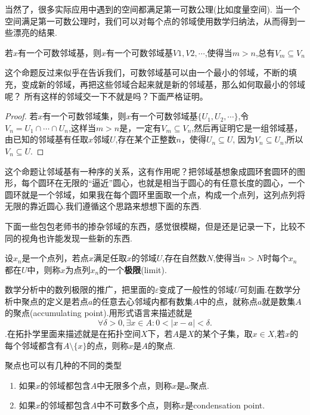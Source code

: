 当然了，很多实际应用中遇到的空间都满足第一可数公理(比如度量空间). 当一个空间满足第一可数公理时，我们可以对每个点的邻域使用数学归纳法，从而得到一些漂亮的结果.

\begin{proposition}
若$x$有一个可数邻域基，则$x$有一个可数邻域基${V1,V2,\cdots}$,使得当$m > n$,总有$V_m \subseteq V_n$
\end{proposition}

这个命题反过来似乎在告诉我们，可数邻域基可以由一个最小的邻域，不断的填充，变成新的邻域，再把这些邻域合起来就是新的邻域基，那么如何取最小的邻域呢？ 所有这样的邻域交一下不就是吗？下面严格证明。

\begin{proof}
若$x$有一个可数邻域集，则$x$有一个可数邻域基$\{U_1,U_2,\cdots\}$,令$V_n=U_1 \cap \cdots \cap U_n$,这样当$m>n$是，一定有$V_m \subseteq V_n$,然后再证明它是一组邻域基，由已知的邻域基有任取$x$邻域$U$,存在某个正整数$n$，使得$U_n \subseteq U$, 因为$V_n \subseteq U_n$,所以$V_n \subseteq U$.
\end{proof}

这个命题让邻域基有一种序的关系，这有作用呢？把邻域基想象成圆环套圆环的图形，每个圆环在无限的“逼近”圆心，也就是相当于圆心的有任意长度的圆心，一个圆环就是一个邻域，如果我在每个圆环里面取一个点，构成一个点列，这列点列将无限的靠近圆心.我们遵循这个思路来想想下面的东西.

下面一些包包老师书的掺杂邻域的东西，感觉很模糊，但是还是记录一下，比较不同的视角也许能发现一些新的东西.
\begin{definition}
设${x_n}$是一个点列，若点$x$满足任取$x$的邻域$U$,存在自然数$N$,使得当$n > N$时每个$x_n$都在$U$中，则称$x$为点列${x_n}$的一个\textbf{极限}(limit).
\end{definition}

数学分析中的数列极限的推广，把里面的$\varepsilon$变成了一般性的邻域$U$可刻画.在数学分析中聚点的定义是若点$a$的任意去心邻域内都有数集$A$中的点，就称点$a$就是数集$A$的聚点(accumulating point).用形式语言来描述就是\[\forall \delta > 0,\exists x \in A \colon 0 < |x-a| < \delta.\].在拓扑学里面来描述就是在拓扑空间$X$下，若$A$是$X$的某个子集，取$x \in X$,若$x$的每个邻域都含有$A \setminus \{x\}$的点，则称$x$是$A$的聚点.

聚点也可以有几种的不同的类型

\begin{enumerate}
 \item 如果$x$的邻域都包含$A$中无限多个点，则称$x$是$\omega$聚点.
 \item 如果$x$的邻域都包含$A$中不可数多个点，则称$x$是condensation point.
\end{enumerate}


